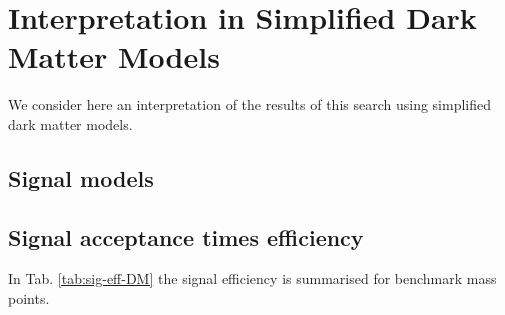 \section{Interpretation in Simplified Dark Matter Models}
\label{sec:DM}

We consider here an interpretation of the results of this search using simplified dark matter models.

\subsection{Signal models}
\label{sec:DM_models}


\clearpage
\subsection{Signal acceptance times efficiency}
\label{sec:sig-accept-contam-DM}

In Tab. \ref{tab:sig-eff-DM} the signal efficiency is summarised for benchmark
mass points.


